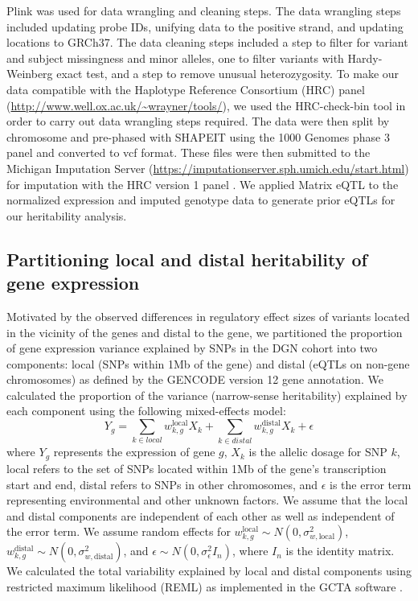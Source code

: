 \documentclass[10pt,letterpaper]{article}
\begin{document}
Plink \cite{chang2015second} was used for data wrangling and cleaning steps. The data wrangling steps included updating probe IDs, unifying data to the positive strand, and updating locations to GRCh37. The data cleaning steps included a step to filter for variant and subject missingness and minor alleles, one to filter variants with Hardy-Weinberg exact test, and a step to remove unusual heterozygosity. To make our data compatible with the Haplotype Reference Consortium (HRC) panel (\url{http://www.well.ox.ac.uk/~wrayner/tools/}), we used the HRC-check-bin tool in order to carry out data wrangling steps required. The data were then split by chromosome and pre-phased with SHAPEIT \cite{delaneau2012linear} using the 1000 Genomes phase 3 panel and converted to vcf format. These files were then submitted to the Michigan Imputation Server (\url{https://imputationserver.sph.umich.edu/start.html}) \cite{Howie_2012,Fuchsberger_2014} for imputation with the HRC version 1 panel \cite{mccarthy2015reference}.  We applied Matrix eQTL \cite{shabalin2012matrix} to the normalized expression and imputed genotype data to generate prior eQTLs for our heritability analysis.

\subsection*{Partitioning local and distal heritability of gene
expression}\label{partitioning-local-and-distal-heritability-of-gene-expression}

Motivated by the observed differences in regulatory effect sizes of variants located in the vicinity of the genes and distal to the gene,
we partitioned the proportion of gene expression variance explained by
SNPs in the DGN cohort into two components: local (SNPs within 1Mb of
the gene) and distal (eQTLs on non-gene chromosomes) as defined by the
GENCODE \cite{Harrow_2012} version 12 gene annotation. We calculated the
proportion of the variance (narrow-sense heritability) explained by each
component using the following mixed-effects model:
%
\[ Y_g = \sum_{k  \in local}w^\text{local}_{k,g} X_k + \sum_{k  \in distal}w^\text{distal}_{k,g} X_k + \epsilon \]
%
where $Y_g$ represents the expression of gene $g$, $X_k$ is the allelic dosage for SNP $k$, local refers to the set of SNPs located within 1Mb of the gene's transcription start and end, distal refers to SNPs in other chromosomes, and $\epsilon$ is the error term representing environmental and other unknown factors. We assume that the local and distal components are independent of each other as well as independent of the error term.
We assume random effects for \(w^\text{local}_{k,g} \sim N(0, \sigma^2_{w,\text{local}})\), \(w^\text{distal}_{k,g} \sim N(0, \sigma^2_{w,\text{distal}})\), and
\(\epsilon \sim N(0, \sigma^2_{\epsilon} I_n)\), where \(I_n\) is the
identity matrix. We calculated the total variability explained by local
and distal components using restricted
maximum likelihood (REML) as implemented in the GCTA software \cite{Yang_2011}. 
\end{document}
